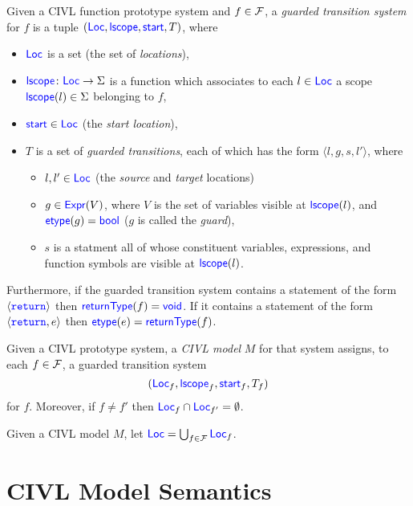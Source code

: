 \documentclass[11pt]{book}
\begin{document}
\begin{definition}
  Given a CIVL function prototype system and $f\in\Func$,
  a \emph{guarded transition system} for $f$ 
  is a tuple $(\Loc,\lscope,\start, T)$, where
  \begin{itemize}
  \item $\Loc$ is a set (the set of \emph{locations}),
  \item $\lscope\colon\Loc\ra\Sigma$ is a function which associates
    to each $l\in\Loc$ a scope $\lscope(l)\in\Sigma$ belonging to $f$,
  \item $\start\in\Loc$ (the \emph{start location}),
  \item $T$ is a set of \emph{guarded transitions}, each of which has
    the form $\langle l,g,s,l'\rangle$, where
    \begin{itemize}
    \item $l,l'\in\Loc$ (the \emph{source} and \emph{target}
      locations)
    \item $g\in\Expr(V)$, where $V$ is the set of variables visible at
      $\lscope(l)$, and $\etype(g)=\bool$ ($g$ is called the
      \emph{guard}),
    \item $s$ is a statment all of whose constituent variables,
      expressions, and function symbols are visible at $\lscope(l)$.
    \end{itemize}
  \end{itemize}
  Furthermore, if the guarded transition system contains a statement
  of the form $\langle\code{return}\rangle$ then
  $\returntype(f)=\void$.  If it contains a statement of the form
  $\langle\code{return},e\rangle$ then $\etype(e)=\returntype(f)$.
\end{definition}

\begin{definition}
  Given a CIVL prototype system, a \emph{CIVL model} $M$ for that
  system assigns, to each $f\in\Func$, a guarded transition system
  \[(\Loc_f,\lscope_f, \start_f,T_f)\] for $f$.  Moreover, if $f\neq f'$
  then
  $\Loc_f\cap\Loc_{f'}=\emptyset$.
\end{definition}

\begin{definition}
  Given a CIVL model $M$, let $\Loc=\bigcup_{f\in\Func}\Loc_f$.
\end{definition}

\section{CIVL Model Semantics}
\label{sec:semantics}
\end{document}
